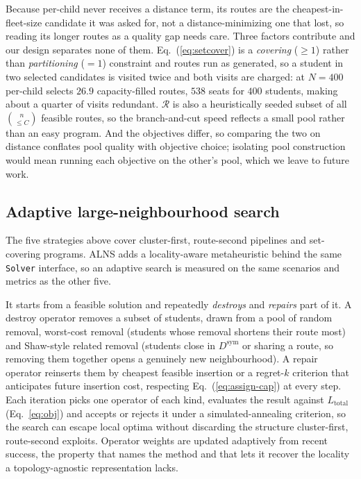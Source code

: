 \documentclass[graybox]{SNmult}
\begin{document}
Because per-child never receives a distance term, its routes are the
cheapest-in-fleet-size candidate it was asked for, not a
distance-minimizing one that lost, so reading its longer routes as a
quality gap needs care. Three factors contribute and our design separates
none of them. Eq.~(\ref{eq:setcover}) is a \emph{covering} ($\ge1$) rather
than \emph{partitioning} ($=1$) constraint and routes run as generated, so
a student in two selected candidates is visited twice and both visits are
charged: at $N=400$ per-child selects $26.9$ capacity-filled routes, $538$
seats for $400$ students, making about a quarter of visits redundant.
$\mathcal{R}$ is also a heuristically seeded subset of all
$\binom{n}{\le C}$ feasible routes, so the branch-and-cut speed reflects a
small pool rather than an easy program. And the objectives differ, so
comparing the two on distance conflates pool quality with objective
choice; isolating pool construction would mean running each objective on
the other's pool, which we leave to future work.

\subsection{Adaptive large-neighbourhood search}\label{sec:alns}
The five strategies above cover cluster-first, route-second pipelines and
set-covering programs. ALNS adds a locality-aware metaheuristic behind the
same \texttt{Solver} interface, so an adaptive search is measured on the
same scenarios and metrics as the other five.

It starts from a feasible solution and repeatedly \emph{destroys} and
\emph{repairs} part of it. A destroy operator removes a subset of
students, drawn from a pool of random removal,
worst-cost removal (students whose removal shortens their route most) and
Shaw-style related removal (students close in $D^{\mathrm{sym}}$ or
sharing a route, so removing them together opens a genuinely new
neighbourhood). A repair operator reinserts them by cheapest feasible
insertion or a regret-$k$ criterion that anticipates future insertion
cost, respecting Eq.~(\ref{eq:assign-cap}) at every step. Each iteration
picks one operator of each kind, evaluates the result against
$L_{\mathrm{total}}$ (Eq.~\ref{eq:obj}) and accepts or rejects it under a
simulated-annealing criterion, so the search can escape local optima
without discarding the structure cluster-first, route-second exploits.
Operator weights are updated adaptively from recent success, the property
that names the method and that lets it recover the locality a
topology-agnostic representation lacks.
\end{document}
